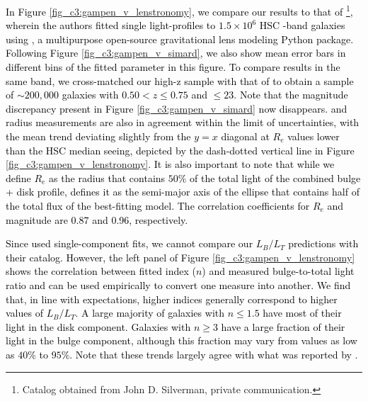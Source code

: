 \textcolor{black}{In Figure \ref{fig_c3:gampen_v_lenstronomy}, we compare our results to that of \citet{hsc_mass_size}\footnote{Catalog obtained from John D. Silverman, private communication.}, wherein the authors fitted single \sersic{} light-profiles to $1.5\times10^6$ HSC \ib{}-band galaxies using \lenstronomy{} \citep{Birrer2018Lenstronomy:Package}, a multipurpose open-source gravitational lens modeling Python package. Following Figure \ref{fig_c3:gampen_v_simard}, we also show mean error bars in different bins of the fitted parameter in this figure. To compare results in the same band, we cross-matched our high-z sample with that of \citet{hsc_mass_size} to obtain a sample of $\sim200,000$ galaxies with $0.50 < z \leq 0.75$ and \ib{} $\leq23$. Note that the magnitude discrepancy present in Figure \ref{fig_c3:gampen_v_simard} now disappears. \gampen{} and \lenstronomy{} radius measurements are also in agreement within the limit of uncertainties, with the mean trend deviating slightly from the $y=x$ diagonal at $R_e$ values lower than the HSC median seeing, depicted by the dash-dotted vertical line in Figure \ref{fig_c3:gampen_v_lenstronomy}. It is also important to note that while we define $R_e$ as the radius that contains $50\%$ of the total light of the combined bulge + disk profile, \citet{hsc_mass_size} defines it as the semi-major axis of the ellipse that contains half of the total flux of the best-fitting \sersic{} model. The correlation coefficients for $R_e$ and magnitude are 0.87 and 0.96, respectively.} 

\textcolor{black}{Since \citet{hsc_mass_size} used single-component fits, we cannot compare our $L_B/L_T$ predictions with their catalog. However, the left panel of Figure \ref{fig_c3:gampen_v_lenstronomy} shows the correlation between fitted \sersic{} index ($n$) and measured bulge-to-total light ratio and can be used empirically to convert one measure into another. We find that, in line with expectations, higher \sersic{} indices generally correspond to higher values of $L_B/L_T$. A large majority of galaxies with $n \leq 1.5$ have most of their light in the disk component. Galaxies with $ n \geq 3$ have a large fraction of their light in the bulge component, although this fraction may vary from values as low as $40\%$ to $95\%$. Note that these trends largely agree with what was reported by \citet{simmons_08}.}


